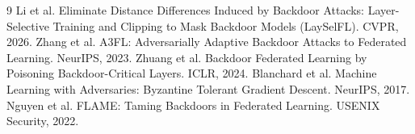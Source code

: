 \begin{thebibliography}{9}
 Li et al. Eliminate Distance Differences Induced by Backdoor Attacks: Layer-Selective
Training and Clipping to Mask Backdoor Models (LaySelFL). CVPR, 2026.
 Zhang et al. A3FL: Adversarially Adaptive Backdoor Attacks to Federated Learning. NeurIPS, 2023.
 Zhuang et al. Backdoor Federated Learning by Poisoning Backdoor-Critical Layers. ICLR, 2024.
 Blanchard et al. Machine Learning with Adversaries: Byzantine Tolerant Gradient Descent. NeurIPS, 2017.
 Nguyen et al. FLAME: Taming Backdoors in Federated Learning. USENIX Security, 2022.
\end{thebibliography}
